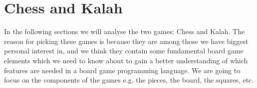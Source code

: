 \section{Chess and Kalah}
\label{sec:chessandkalah}

In the following sections we will analyse the two games: Chess and Kalah. The reason for picking these games is because they are among those we have biggest personal interest in, and we think they contain some fundamental board game elements which we need to know about to gain a better understanding of which features are needed in a board game programming language. We are going to focus on the components of the games e.g. the pieces, the board, the squares, etc.


  

